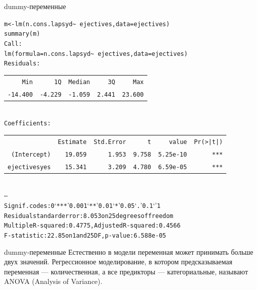\begin{frame}{dummy-переменные}
\scriptsize
\begin{alltt}
m <- lm(n.cons.lapsyd \textasciitilde\ ejectives, data = ejectives)\\
summary(m)\bigskip\\
Call:\\
lm(formula = n.cons.lapsyd \textasciitilde\ ejectives, data = ejectives)\bigskip\\
Residuals:\\
\begin{tabular}{rrrrr}
Min & 1Q & Median & 3Q & Max \\ 
-14.400 & -4.229 & -1.059 & 2.441 & 23.600 \\
\end{tabular}
\bigskip\\
Coefficients:\\
\begin{tabular}{rrrrrr}
& Estimate & Std.  Error & t & value & Pr(>|t|) \\ 
(Intercept) & 19.059 & 1.953 & 9.758 & 5.25e-10 & *** \\ 
\alert{ejectivesyes} & \alert{15.341} & \alert{3.209} & \alert{4.780} & \alert{6.59e-05} & \alert{***} \\ 
\end{tabular}
\\---\\
Signif. codes:  0 ‘***’ 0.001 ‘**’ 0.01 ‘*’ 0.05 ‘.’ 0.1 ‘ ’ 1\bigskip\\
Residual standard error: 8.053 on 25 degrees of freedom\\
Multiple R-squared:  0.4775,	Adjusted R-squared:  0.4566\\ 
F-statistic: 22.85 on 1 and 25 DF,  p-value: 6.588e-05
\end{alltt}
\normalsize
\end{frame}
\begin{frame}{dummy-переменные}
Естественно в модели переменная может принимать больше двух значений.
\vfill
Регрессионное моделирование, в котором предсказываемая переменная — количественная, а все предикторы — категориальные, называют \alert{ANOVA (Analysis of Variance)}.
\end{frame}
